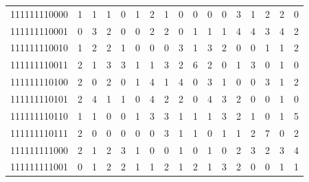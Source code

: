 \documentclass[10pt,a4paper]{article}
\begin{document}
\begin{longtable}{ |c|c|c|c|c|c|c|c|c|c|c|c|c|c|c|c|c| }
    111111110000              & 1                            & 1                                & 1                            & 0                              & 1   & 2   & 1   & 0   & 0   & 0   & 0   & 3   & 1   & 2   & 2   & 0   \\
    111111110001              & 0                            & 3                                & 2                            & 0                              & 0   & 2   & 2   & 0   & 1   & 1   & 1   & 4   & 4   & 3   & 4   & 2   \\
    111111110010              & 1                            & 2                                & 2                            & 1                              & 0   & 0   & 0   & 3   & 1   & 3   & 2   & 0   & 0   & 1   & 1   & 2   \\
    111111110011              & 2                            & 1                                & 3                            & 3                              & 1   & 1   & 3   & 2   & 6   & 2   & 0   & 1   & 3   & 0   & 1   & 0   \\
    111111110100              & 2                            & 0                                & 2                            & 0                              & 1   & 4   & 1   & 4   & 0   & 3   & 1   & 0   & 0   & 3   & 1   & 2   \\
    111111110101              & 2                            & 4                                & 1                            & 1                              & 0   & 4   & 2   & 2   & 0   & 4   & 3   & 2   & 0   & 0   & 1   & 0   \\
    111111110110              & 1                            & 1                                & 0                            & 0                              & 1   & 3   & 3   & 1   & 1   & 1   & 3   & 2   & 1   & 0   & 1   & 5   \\
    111111110111              & 2                            & 0                                & 0                            & 0                              & 0   & 0   & 3   & 1   & 1   & 0   & 1   & 1   & 2   & 7   & 0   & 2   \\
    111111111000              & 2                            & 1                                & 2                            & 3                              & 1   & 0   & 0   & 1   & 0   & 1   & 0   & 2   & 3   & 2   & 3   & 4   \\
    111111111001              & 0                            & 1                                & 2                            & 2                              & 1   & 1   & 2   & 1   & 2   & 1   & 3   & 2   & 0   & 0   & 1   & 1   \\

\end{longtable}
\end{document}

